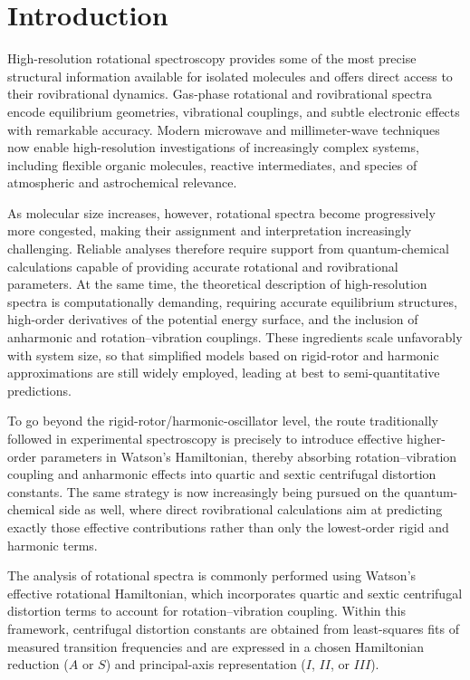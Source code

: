 \documentclass[aip,jcp,reprint,floatfix]{revtex4-2}
\begin{document}
\maketitle

\section{Introduction}

High-resolution rotational spectroscopy provides some of the most
precise structural information available for isolated molecules and
offers direct access to their rovibrational dynamics.
\cite{TownesSchawlow1955,GordyCook1984,BunkerJensen2005}
Gas-phase rotational and rovibrational spectra encode equilibrium
geometries, vibrational couplings, and subtle electronic effects with
remarkable accuracy. Modern microwave and millimeter-wave techniques
now enable high-resolution investigations of increasingly complex
systems, including flexible organic molecules, reactive intermediates,
and species of atmospheric and astrochemical relevance.

As molecular size increases, however, rotational spectra become
progressively more congested, making their assignment and
interpretation increasingly challenging. Reliable analyses therefore
require support from quantum-chemical calculations capable of
providing accurate rotational and rovibrational parameters. At the
same time, the theoretical description of high-resolution spectra is
computationally demanding, requiring accurate equilibrium structures,
high-order derivatives of the potential energy surface, and the
inclusion of anharmonic and rotation--vibration couplings. These
ingredients scale unfavorably with system size, so that simplified
models based on rigid-rotor and harmonic approximations are still
widely employed, leading at best to semi-quantitative predictions.

To go beyond the rigid-rotor/harmonic-oscillator level, the route
traditionally followed in experimental spectroscopy is precisely to
introduce effective higher-order parameters in Watson's Hamiltonian,
thereby absorbing rotation--vibration coupling and anharmonic effects
into quartic and sextic centrifugal distortion constants. The same
strategy is now increasingly being pursued on the quantum-chemical
side as well, where direct rovibrational calculations aim at
predicting exactly those effective contributions rather than only the
lowest-order rigid and harmonic terms.

The analysis of rotational spectra is commonly performed using
Watson's effective rotational Hamiltonian,
\cite{Watson1968,Watson1977,Watson1968JCP,AlievWatson1976}
which incorporates quartic and sextic centrifugal distortion terms to
account for rotation--vibration coupling. Within this framework,
centrifugal distortion constants are obtained from least-squares fits
of measured transition frequencies and are expressed in a chosen
Hamiltonian reduction ($A$ or $S$) and principal-axis representation
($I$, $II$, or $III$).
\end{document}
